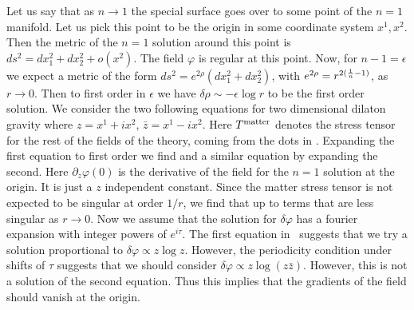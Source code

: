 Let us say  that as $n \to 1 $ the special surface goes over to some point  of the $n=1$ manifold. Let us
pick this point to be the origin in some coordinate system  $x^1,x^2$. Then the metric of the $n=1$ solution around this
point is $ds^2 = dx_1^2 +dx_2^2 + o(x^2)$. The field $\varphi$ is regular at this point. Now, for $n-1 = \epsilon$ we
expect a metric of the form $ ds^2 = e^{ 2 \rho} ( dx_1^2 + dx_2^2 )$, with
$ e^{ 2 \rho } = r^{ 2 ( { 1 \over n } -1 ) } $, as $r \to 0$.
 Then to first order in $\epsilon $ we have
$\delta \rho \sim -  \epsilon  \log r $ to be the first order solution.
We consider the two following equations for two dimensional dilaton gravity
\eqn{}
 where $z = x^1 + i x^2$, $\bar z = x^1 - i x^2 $.
 Here $T^{\rm matter} $ denotes the stress tensor for the rest of the fields of the theory, coming from the dots in \twoddg . Expanding the first
 equation to first order we find
 \eqn{}
 and a similar equation by expanding the second. Here $\partial_z \varphi(0)$ is the derivative of the field for the
 $n=1$ solution at the origin. It is just a $z$ independent constant.
 Since the matter stress tensor is not expected to be  singular at order $1/r$,
 we find that
 \eqn{}
up to terms that are less singular as $r\to 0$.
Now we assume that the solution for $\delta \varphi$ has a fourier expansion with integer powers of $e^{ i \tau } $.
The first equation in \condc\ suggests that we try a solution proportional to $ \delta \varphi \propto z \log z$.
However, the periodicity condition under shifts of $\tau$ suggests that we should consider $\delta \varphi \propto
z \log( z \bar z )$. However, this is not a solution of the second equation. Thus this implies that the gradients of
the field should vanish at the origin.

